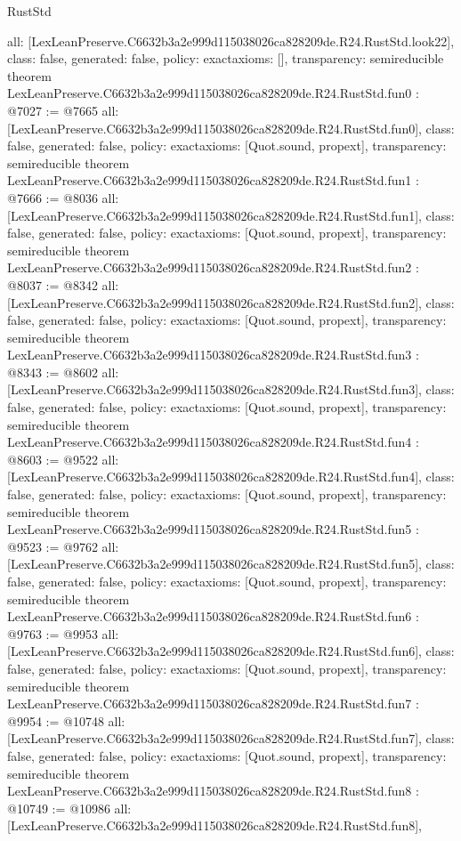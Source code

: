 \begin{lexlean}{RustStd}
\begin{coremodule}
{  all: [LexLeanPreserve.C6632b3a2e999d115038026ca828209de.R24.RustStd.look22],
  class: false,
  generated: false,
  policy: exact{axioms: []},
  transparency: semireducible
}
theorem LexLeanPreserve.C6632b3a2e999d115038026ca828209de.R24.RustStd.fun0 : @7027 := @7665 {
  all: [LexLeanPreserve.C6632b3a2e999d115038026ca828209de.R24.RustStd.fun0],
  class: false,
  generated: false,
  policy: exact{axioms: [Quot.sound, propext]},
  transparency: semireducible
}
theorem LexLeanPreserve.C6632b3a2e999d115038026ca828209de.R24.RustStd.fun1 : @7666 := @8036 {
  all: [LexLeanPreserve.C6632b3a2e999d115038026ca828209de.R24.RustStd.fun1],
  class: false,
  generated: false,
  policy: exact{axioms: [Quot.sound, propext]},
  transparency: semireducible
}
theorem LexLeanPreserve.C6632b3a2e999d115038026ca828209de.R24.RustStd.fun2 : @8037 := @8342 {
  all: [LexLeanPreserve.C6632b3a2e999d115038026ca828209de.R24.RustStd.fun2],
  class: false,
  generated: false,
  policy: exact{axioms: [Quot.sound, propext]},
  transparency: semireducible
}
theorem LexLeanPreserve.C6632b3a2e999d115038026ca828209de.R24.RustStd.fun3 : @8343 := @8602 {
  all: [LexLeanPreserve.C6632b3a2e999d115038026ca828209de.R24.RustStd.fun3],
  class: false,
  generated: false,
  policy: exact{axioms: [Quot.sound, propext]},
  transparency: semireducible
}
theorem LexLeanPreserve.C6632b3a2e999d115038026ca828209de.R24.RustStd.fun4 : @8603 := @9522 {
  all: [LexLeanPreserve.C6632b3a2e999d115038026ca828209de.R24.RustStd.fun4],
  class: false,
  generated: false,
  policy: exact{axioms: [Quot.sound, propext]},
  transparency: semireducible
}
theorem LexLeanPreserve.C6632b3a2e999d115038026ca828209de.R24.RustStd.fun5 : @9523 := @9762 {
  all: [LexLeanPreserve.C6632b3a2e999d115038026ca828209de.R24.RustStd.fun5],
  class: false,
  generated: false,
  policy: exact{axioms: [Quot.sound, propext]},
  transparency: semireducible
}
theorem LexLeanPreserve.C6632b3a2e999d115038026ca828209de.R24.RustStd.fun6 : @9763 := @9953 {
  all: [LexLeanPreserve.C6632b3a2e999d115038026ca828209de.R24.RustStd.fun6],
  class: false,
  generated: false,
  policy: exact{axioms: [Quot.sound, propext]},
  transparency: semireducible
}
theorem LexLeanPreserve.C6632b3a2e999d115038026ca828209de.R24.RustStd.fun7 : @9954 := @10748 {
  all: [LexLeanPreserve.C6632b3a2e999d115038026ca828209de.R24.RustStd.fun7],
  class: false,
  generated: false,
  policy: exact{axioms: [Quot.sound, propext]},
  transparency: semireducible
}
theorem LexLeanPreserve.C6632b3a2e999d115038026ca828209de.R24.RustStd.fun8 : @10749 := @10986 {
  all: [LexLeanPreserve.C6632b3a2e999d115038026ca828209de.R24.RustStd.fun8],
}
\end{coremodule}
\end{lexlean}
